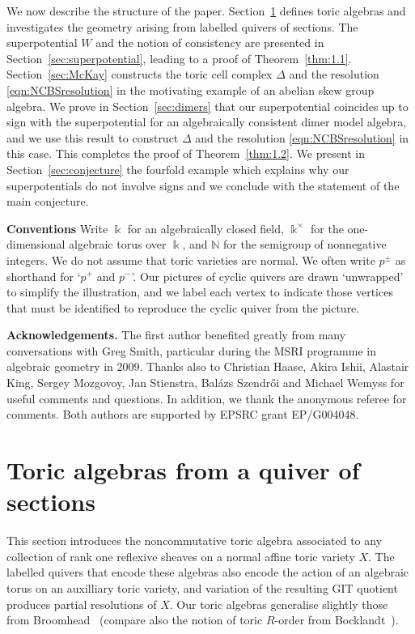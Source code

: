 \documentclass[11pt,a4paper]{amsart}
\numberwithin{equation}{section}
\theoremstyle{definition}
\theoremstyle{remark}
\newcommand{\kk}{\ensuremath{\Bbbk}}
\newcommand{\NN}{\ensuremath{\mathbb{N}}}
\begin{document}
We now describe the structure of the paper. Section~\ref{sec:toricalgebras} defines toric algebras and investigates the geometry arising from labelled quivers of sections. The superpotential $W$ and the notion of consistency are presented in Section~\ref{sec:superpotential}, leading to a proof of Theorem~\ref{thm:1.1}. Section~\ref{sec:McKay} constructs the toric cell complex $\Delta$ and the resolution \eqref{eqn:NCBSresolution} in the motivating example of an abelian skew group algebra. We prove in Section~\ref{sec:dimers} that our superpotential coincides up to sign with the superpotential for an algebraically consistent dimer model algebra, and we use this result to construct $\Delta$ and the resolution \eqref{eqn:NCBSresolution} in this case. This completes the proof of Theorem~\ref{thm:1.2}. We present in Section~\ref{sec:conjecture} the fourfold example which explains why our superpotentials do not involve signs and we conclude with the statement of the main conjecture.


\medskip
\noindent\textbf{Conventions}
  Write $\kk$ for an algebraically closed field, $\kk^\times$ for the one-dimensional algebraic torus over
   $\kk$, and $\NN$ for the semigroup of nonnegative integers. We do not assume that toric
   varieties are normal. We often write $p^\pm$ as shorthand for `$p^+$ and $p^-$'.  Our pictures of cyclic quivers are drawn `unwrapped' to simplify the illustration, and we label each vertex to indicate those vertices that must be identified to reproduce the cyclic quiver from the picture.
   
   
\medskip
\noindent\textbf{Acknowledgements.}  The first author benefited greatly from many conversations with Greg Smith, particular during the MSRI programme in algebraic geometry in 2009.  Thanks also to Christian Haase, Akira Ishii,  Alastair King, Sergey Mozgovoy, Jan Stienstra,  Bal\'{a}zs Szendr\H{o}i and Michael Wemyss  for useful comments and questions.  In addition, we thank the anonymous referee for comments. Both authors are supported by EPSRC grant EP/G004048.



  \section{Toric algebras from a quiver of sections}
  \label{sec:toricalgebras}
  This section introduces the noncommutative toric algebra associated to any collection of rank one reflexive sheaves on a normal affine toric variety $X$.  The labelled quivers that encode these algebras also encode the action of an algebraic torus on an auxilliary toric variety, and variation of the resulting GIT quotient produces partial resolutions of $X$. Our toric algebras generalise slightly those from Broomhead~\cite{Broomhead} (compare also the notion of toric $R$-order from Bocklandt~\cite{Bocklandt}).
\end{document}
